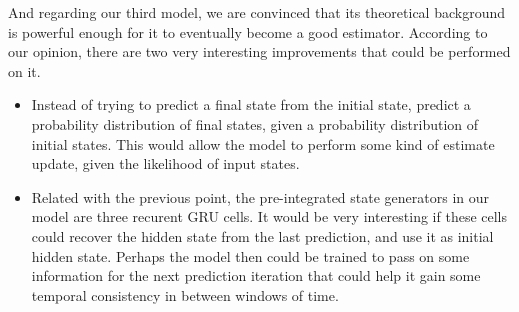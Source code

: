 And regarding our third model, we are convinced that its theoretical background is powerful enough for it to eventually become a good estimator.
According to our opinion, there are two very interesting improvements that could be performed on it.
\begin{itemize}
    \item Instead of trying to predict a final state from the initial state, predict a probability distribution of final states, given a probability distribution of initial states. 
    This would allow the model to perform some kind of estimate update, given the likelihood of input states.
    \item Related with the previous point, the pre-integrated state generators in our model are three recurent GRU cells. 
    It would be very interesting if these cells could recover the hidden state from the last prediction, and use it as initial hidden state.
    Perhaps the model then could be trained to pass on some information for the next prediction iteration that could help it gain some temporal consistency in between windows of time.
\end{itemize}